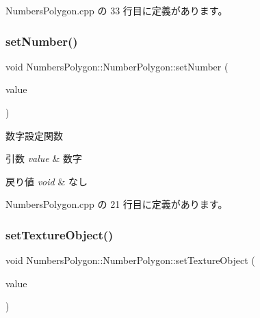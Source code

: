 Numbers\+Polygon.\+cpp の 33 行目に定義があります。

\mbox{\label{class_numbers_polygon_1_1_number_polygon_aed0291a733964cf55fc0b64e7cb94913}} 
\subsubsection{\texorpdfstring{set\+Number()}{setNumber()}}
{\footnotesize\ttfamily void Numbers\+Polygon\+::\+Number\+Polygon\+::set\+Number (\begin{DoxyParamCaption}\item[{int}]{value }\end{DoxyParamCaption})}



数字設定関数 


\begin{DoxyParams}{引数}
{\em value} & 数字 \\
\hline
\end{DoxyParams}

\begin{DoxyRetVals}{戻り値}
{\em void} & なし \\
\hline
\end{DoxyRetVals}


 Numbers\+Polygon.\+cpp の 21 行目に定義があります。

\mbox{\label{class_numbers_polygon_1_1_number_polygon_a93cf66894af5d7f93eeba793c9776fdf}} 
\subsubsection{\texorpdfstring{set\+Texture\+Object()}{setTextureObject()}}
{\footnotesize\ttfamily void Numbers\+Polygon\+::\+Number\+Polygon\+::set\+Texture\+Object (\begin{DoxyParamCaption}\item[{\mbox{\hyperlink{class_texture_object}{Texture\+Object}} $\ast$}]{value }\end{DoxyParamCaption})}



